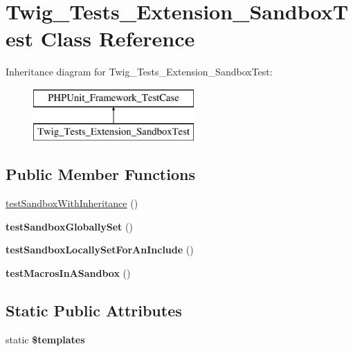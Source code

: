 \hypertarget{classTwig__Tests__Extension__SandboxTest}{}\section{Twig\+\_\+\+Tests\+\_\+\+Extension\+\_\+\+Sandbox\+Test Class Reference}
\label{classTwig__Tests__Extension__SandboxTest}
Inheritance diagram for Twig\+\_\+\+Tests\+\_\+\+Extension\+\_\+\+Sandbox\+Test\+:\begin{figure}[H]
\begin{center}
\leavevmode
\includegraphics[height=2.000000cm]{classTwig__Tests__Extension__SandboxTest}
\end{center}
\end{figure}
\subsection*{Public Member Functions}
\begin{DoxyCompactItemize}
\item 
\hyperlink{classTwig__Tests__Extension__SandboxTest_a67ee19cf4da5956642c3414f88bd9223}{test\+Sandbox\+With\+Inheritance} ()
\item 
{\bfseries test\+Sandbox\+Globally\+Set} ()\hypertarget{classTwig__Tests__Extension__SandboxTest_a7e337df964311c4d0b2fc69ad2d78b5a}{}\label{classTwig__Tests__Extension__SandboxTest_a7e337df964311c4d0b2fc69ad2d78b5a}

\item 
{\bfseries test\+Sandbox\+Locally\+Set\+For\+An\+Include} ()\hypertarget{classTwig__Tests__Extension__SandboxTest_a134e222593e6d5f21cdfcd8b5c85bd00}{}\label{classTwig__Tests__Extension__SandboxTest_a134e222593e6d5f21cdfcd8b5c85bd00}

\item 
{\bfseries test\+Macros\+In\+A\+Sandbox} ()\hypertarget{classTwig__Tests__Extension__SandboxTest_a367e710f6a72341068148e9738735323}{}\label{classTwig__Tests__Extension__SandboxTest_a367e710f6a72341068148e9738735323}

\end{DoxyCompactItemize}
\subsection*{Static Public Attributes}
\begin{DoxyCompactItemize}
\item 
static {\bfseries \$templates}\hypertarget{classTwig__Tests__Extension__SandboxTest_a28d9b9aa099b440b2d27e60c6d6e7e60}{}\label{classTwig__Tests__Extension__SandboxTest_a28d9b9aa099b440b2d27e60c6d6e7e60}

\end{DoxyCompactItemize}
